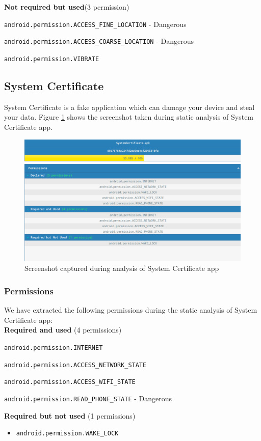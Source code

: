 \textbf{Not required but used}(3 permission)
\begin{itemize}
\begin{spacing}{0.9}
\item \texttt{android.permission.ACCESS\_FINE\_LOCATION} \hfill - Dangerous
\item \texttt{android.permission.ACCESS\_COARSE\_LOCATION} \hfill - Dangerous
\item \texttt{android.permission.VIBRATE}
\end{spacing}
\end{itemize}
\subsection{System Certificate}
System Certificate  is a fake application which can damage your device and steal your data. Figure \ref{fig:system} shows the screenshot taken during static analysis of System Certificate app.
\begin{figure}[!h]
  \centering
  \includegraphics [scale=0.5] {system.png}
  \caption{Screenshot captured during analysis of System Certificate app}
  \label{fig:system}
\end{figure}
\subsubsection{Permissions}
We have extracted the following permissions during the static analysis of System Certificate app:\\

\textbf{Required and used} (4 permissions)
\begin{itemize}
\begin{spacing}{0.9}
\item \texttt{android.permission.INTERNET}
\item \texttt{android.permission.ACCESS\_NETWORK\_STATE}
\item \texttt{android.permission.ACCESS\_WIFI\_STATE}
\item \texttt{android.permission.READ\_PHONE\_STATE} \hfill - Dangerous
\end{spacing}
\end{itemize}
\textbf{Required but not used} (1 permissions)
\begin{itemize}
    \item \texttt{android.permission.WAKE\_LOCK}
\end{itemize}

